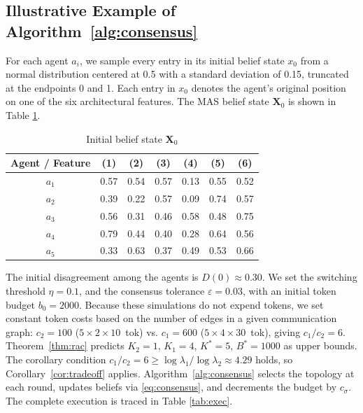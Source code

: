 \documentclass[journal,twoside,web]{ieeecolor_no_firstpage_logo}
\begin{document}
\subsection{Illustrative Example of Algorithm~\ref{alg:consensus}}
For each agent $a_i$, we sample every entry in its initial belief state $x_0$ from a normal distribution centered at 0.5 with a standard deviation of 0.15, truncated at the endpoints 0 and 1. Each entry in $x_0$ denotes the agent's original position on one of the six architectural features. The MAS belief state $\mathbf{X}_0$ is shown in Table \ref{tab:init_belief}.
\begin{table}[h]
\caption{Initial belief state $\mathbf{X}_0$}
\label{tab:init_belief}
\begin{center}
\begin{tabular}{c c c c c c c} 
\toprule
 Agent / Feature & (1) & (2) & (3) & (4) & (5) & (6) \\  
\midrule
 $a_1$ & 0.57 & 0.54 & 0.57 & 0.13 & 0.55 & 0.52 \\ 
 $a_2$ & 0.39 & 0.22 & 0.57 & 0.09 & 0.74 & 0.57 \\
 $a_3$ & 0.56 & 0.31 & 0.46 & 0.58 & 0.48 & 0.75 \\
 $a_4$ & 0.79 & 0.44 & 0.40 & 0.28 & 0.64 & 0.56 \\
 $a_5$ & 0.33 & 0.63 & 0.37 & 0.49 & 0.53 & 0.66 \\ 
\bottomrule
\end{tabular}
\end{center}
\end{table}
The initial disagreement among the agents is $D(0)\approx0.30$. We set the switching threshold $\eta=0.1$, and the consensus tolerance 
$\varepsilon=0.03$, with an initial token budget $b_0=2000$. Because these simulations do not expend tokens, we set constant token costs based on the number of edges in a given communication graph: $c_2\!=\!100$ ($5\!\times\!2\!\times\!10$~tok) vs.  $c_1\!=\!600$  
($5\!\times\!4\!\times\!30$~tok), giving $c_1/c_2=6$.
Theorem~\ref{thm:rac} predicts $K_2=1$, $K_1=4$, $K^*=5$,
$B^*=1000$ as upper bounds.
The corollary condition $c_1/c_2=6\ge\log\lambda_1/\log\lambda_2\approx4.29$
holds, so Corollary~\ref{cor:tradeoff} applies.
Algorithm~\ref{alg:consensus} selects the topology at each round,
updates beliefs via \eqref{eq:consensus}, and decrements
the budget by $c_\sigma$.
The complete execution is traced in Table \ref{tab:exec}. 
\end{document}
